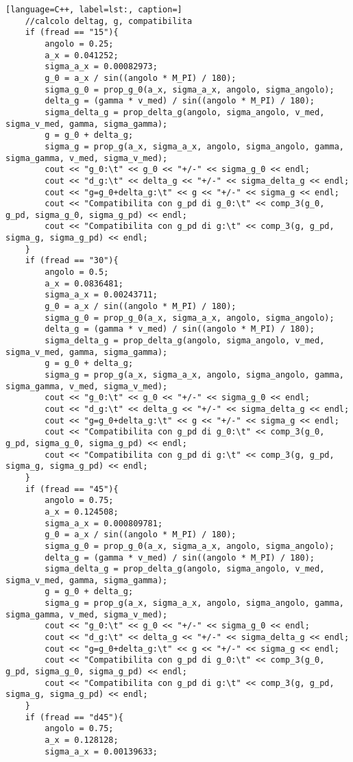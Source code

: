 \documentclass[a4paper,11pt,oneside]{article}
\begin{document}
\begin{lstlisting}[language=C++, label=lst:, caption=]
	//calcolo deltag, g, compatibilita
	if (fread == "15"){
		angolo = 0.25;
		a_x = 0.041252;
		sigma_a_x = 0.00082973;
		g_0 = a_x / sin((angolo * M_PI) / 180);
		sigma_g_0 = prop_g_0(a_x, sigma_a_x, angolo, sigma_angolo);
		delta_g = (gamma * v_med) / sin((angolo * M_PI) / 180);
		sigma_delta_g = prop_delta_g(angolo, sigma_angolo, v_med, sigma_v_med, gamma, sigma_gamma);
		g = g_0 + delta_g;
		sigma_g = prop_g(a_x, sigma_a_x, angolo, sigma_angolo, gamma, sigma_gamma, v_med, sigma_v_med);
		cout << "g_0:\t" << g_0 << "+/-" << sigma_g_0 << endl;
		cout << "d_g:\t" << delta_g << "+/-" << sigma_delta_g << endl;
		cout << "g=g_0+delta_g:\t" << g << "+/-" << sigma_g << endl;
		cout << "Compatibilita con g_pd di g_0:\t" << comp_3(g_0, g_pd, sigma_g_0, sigma_g_pd) << endl;
		cout << "Compatibilita con g_pd di g:\t" << comp_3(g, g_pd, sigma_g, sigma_g_pd) << endl;
	}
	if (fread == "30"){
		angolo = 0.5;
		a_x = 0.0836481;
		sigma_a_x = 0.00243711;
		g_0 = a_x / sin((angolo * M_PI) / 180);
		sigma_g_0 = prop_g_0(a_x, sigma_a_x, angolo, sigma_angolo);
		delta_g = (gamma * v_med) / sin((angolo * M_PI) / 180);
		sigma_delta_g = prop_delta_g(angolo, sigma_angolo, v_med, sigma_v_med, gamma, sigma_gamma);
		g = g_0 + delta_g;
		sigma_g = prop_g(a_x, sigma_a_x, angolo, sigma_angolo, gamma, sigma_gamma, v_med, sigma_v_med);
		cout << "g_0:\t" << g_0 << "+/-" << sigma_g_0 << endl;
		cout << "d_g:\t" << delta_g << "+/-" << sigma_delta_g << endl;
		cout << "g=g_0+delta_g:\t" << g << "+/-" << sigma_g << endl;
		cout << "Compatibilita con g_pd di g_0:\t" << comp_3(g_0, g_pd, sigma_g_0, sigma_g_pd) << endl;
		cout << "Compatibilita con g_pd di g:\t" << comp_3(g, g_pd, sigma_g, sigma_g_pd) << endl;
	}
	if (fread == "45"){
		angolo = 0.75;
		a_x = 0.124508;
		sigma_a_x = 0.000809781;
		g_0 = a_x / sin((angolo * M_PI) / 180);
		sigma_g_0 = prop_g_0(a_x, sigma_a_x, angolo, sigma_angolo);
		delta_g = (gamma * v_med) / sin((angolo * M_PI) / 180);
		sigma_delta_g = prop_delta_g(angolo, sigma_angolo, v_med, sigma_v_med, gamma, sigma_gamma);
		g = g_0 + delta_g;
		sigma_g = prop_g(a_x, sigma_a_x, angolo, sigma_angolo, gamma, sigma_gamma, v_med, sigma_v_med);
		cout << "g_0:\t" << g_0 << "+/-" << sigma_g_0 << endl;
		cout << "d_g:\t" << delta_g << "+/-" << sigma_delta_g << endl;
		cout << "g=g_0+delta_g:\t" << g << "+/-" << sigma_g << endl;
		cout << "Compatibilita con g_pd di g_0:\t" << comp_3(g_0, g_pd, sigma_g_0, sigma_g_pd) << endl;
		cout << "Compatibilita con g_pd di g:\t" << comp_3(g, g_pd, sigma_g, sigma_g_pd) << endl;
	}
	if (fread == "d45"){
		angolo = 0.75;
		a_x = 0.128128;
		sigma_a_x = 0.00139633;

\end{lstlisting}
\end{document}
